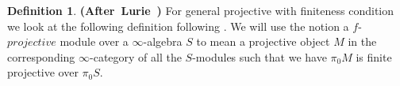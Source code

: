 \documentclass[12pt]{amsart}
\theoremstyle{definition}
\newtheorem{definition}[theorem]{Definition}
\newtheorem{remark}[theorem]{Remark}
\numberwithin{equation}{section}
\newtheorem{example}[theorem]{Example}
\begin{document}




\begin{definition} \mbox{\bf{(After Lurie \cite[Corollary 7.2.2.9,Definition 7.2.2.10]{Lu1})}}
For general projective with finiteness condition we look at the following definition following \cite[Corollary 7.2.2.9]{Lu1}. We will use the notion a $f$-$projective$ module over a $\infty$-algebra $S$ to mean a projective object $M$ in the corresponding $\infty$-category of all the $S$-modules such that we have $\pi_0M$ is finite projective over $\pi_0 S$. 	
\end{definition}






\end{document}
